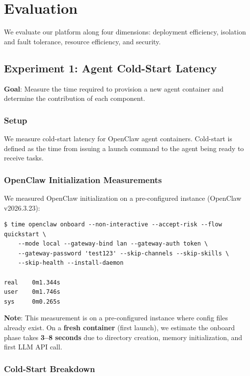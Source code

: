 \section{Evaluation}
\label{sec:evaluation}

We evaluate our platform along four dimensions: deployment efficiency, isolation and fault tolerance, resource efficiency, and security.

\subsection{Experiment 1: Agent Cold-Start Latency}

\textbf{Goal}: Measure the time required to provision a new agent container and determine the contribution of each component.

\subsubsection{Setup}
We measure cold-start latency for OpenClaw agent containers. Cold-start is defined as the time from issuing a launch command to the agent being ready to receive tasks.

\subsubsection{OpenClaw Initialization Measurements}
We measured OpenClaw initialization on a pre-configured instance (OpenClaw v2026.3.23):

\begin{verbatim}
$ time openclaw onboard --non-interactive --accept-risk --flow quickstart \
    --mode local --gateway-bind lan --gateway-auth token \
    --gateway-password 'test123' --skip-channels --skip-skills \
    --skip-health --install-daemon

real    0m1.344s
user    0m1.746s
sys     0m0.265s
\end{verbatim}

\textbf{Note}: This measurement is on a pre-configured instance where config files already exist. On a \textbf{fresh container} (first launch), we estimate the onboard phase takes \textbf{3--8 seconds} due to directory creation, memory initialization, and first LLM API call.

\subsubsection{Cold-Start Breakdown}

